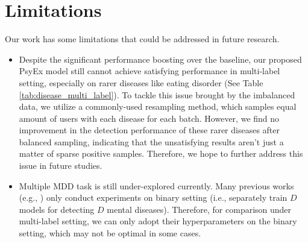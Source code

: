\section{Limitations}
\label{sec:limitations}

Our work has some limitations that could be addressed in future research. 

\begin{itemize}
    \item Despite the significant performance boosting over the baseline, our proposed PsyEx model still cannot achieve satisfying performance in multi-label setting, especially on rarer diseases like eating disorder (See Table \ref{tab:disease_multi_label}). To tackle this issue brought by the imbalanced data,  we utilize a commonly-used resampling method, which samples equal amount of users with each disease for each batch. However, we find no improvement in the detection performance of these rarer diseases after balanced sampling, indicating that the unsatisfying results aren't just a matter of sparse positive samples. Therefore, we hope to further address this issue in future studies.
    \item Multiple MDD task is still under-explored currently. Many previous works (e.g., \citet{sekulic2019adapting}) only conduct experiments on binary setting (i.e., separately train $D$ models for detecting $D$ mental diseases). Therefore, for comparison under multi-label setting, we can only adopt their hyperparameters on the binary setting, which may not be optimal in some cases. 
\end{itemize}
  


